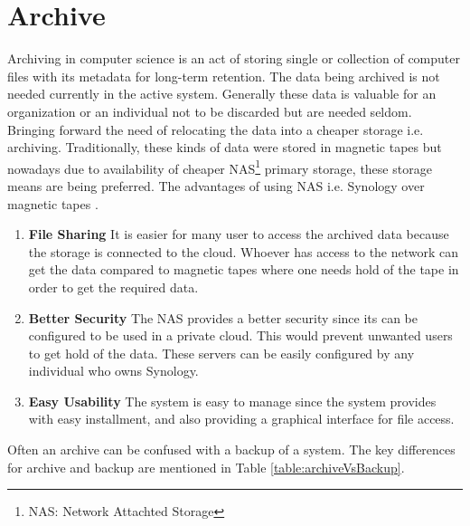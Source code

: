 \section{Archive}

Archiving in computer science is an act of storing single or collection of computer files with its metadata for long-term retention. The data being archived is 
not needed currently in the active system. Generally these data is valuable for an organization or an individual not to be discarded but are needed seldom. 
Bringing forward the need of relocating the data into a cheaper storage i.e. archiving. Traditionally, these kinds of data were stored in magnetic tapes but nowadays 
due to availability of cheaper NAS\footnote{NAS: Network Attachted Storage} primary storage, 
these storage means are being preferred. 
The advantages of using NAS i.e. Synology over magnetic tapes \cite{Synology}.
\begin{enumerate}
    \item \textbf{File Sharing} It is easier for many user to access the archived data because the storage is connected to the cloud. Whoever has access to the
    network can get the data compared to magnetic tapes where one needs hold of the tape in order to get the required data.
    \item \textbf{Better Security} The NAS provides a better security since its can be configured to be used in a private cloud. This would prevent unwanted users
    to get hold of the data. These servers can be easily configured by any individual who owns Synology.
    \item \textbf{Easy Usability} The system is easy to manage since the system provides with easy installment, and also providing a graphical interface for file access.
\end{enumerate}
Often an archive can be confused
with a backup of a system. The key differences for archive and backup are mentioned in Table \ref{table:archiveVsBackup}.

